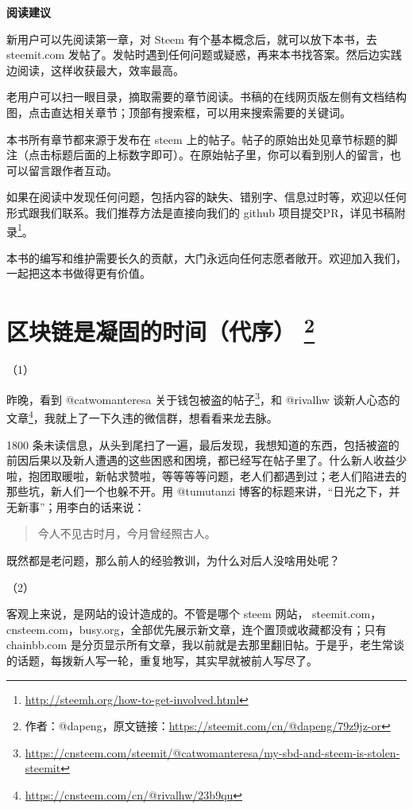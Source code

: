 \documentclass[]{ctexbook}
\renewcommand{\href}[2]{#2\footnote{\url{#1}}}
\begin{document}
\textbf{阅读建议}

新用户可以先阅读第一章，对 Steem 有个基本概念后，就可以放下本书，去 steemit.com 发帖了。发帖时遇到任何问题或疑惑，再来本书找答案。然后边实践边阅读，这样收获最大，效率最高。

老用户可以扫一眼目录，摘取需要的章节阅读。书稿的在线网页版左侧有文档结构图，点击直达相关章节；顶部有搜索框，可以用来搜索需要的关键词。

本书所有章节都来源于发布在 steem 上的帖子。帖子的原始出处见章节标题的脚注（点击标题后面的上标数字即可）。在原始帖子里，你可以看到别人的留言，也可以留言跟作者互动。

如果在阅读中发现任何问题，包括内容的缺失、错别字、信息过时等，欢迎以任何形式跟我们联系。我们推荐方法是直接向我们的 github 项目提交PR，详见\href{http://steemh.org/how-to-get-involved.html}{书稿附录}。

本书的编写和维护需要长久的贡献，大门永远向任何志愿者敞开。欢迎加入我们，一起把这本书做得更有价值。

\hypertarget{secpre}{%
\chapter*{\texorpdfstring{区块链是凝固的时间（代序） \footnote{作者：@dapeng，原文链接：\url{https://steemit.com/cn/@dapeng/79z9jz-or}}}{区块链是凝固的时间（代序） }}\label{secpre}}

（1）

昨晚，看到 \href{https://cnsteem.com/steemit/@catwomanteresa/my-sbd-and-steem-is-stolen-steemit}{@catwomanteresa 关于钱包被盗的帖子}，和 \href{https://cnsteem.com/cn/@rivalhw/23b9qu}{@rivalhw 谈新人心态的文章}，我就上了一下久违的微信群，想看看来龙去脉。

1800 条未读信息，从头到尾扫了一遍，最后发现，我想知道的东西，包括被盗的前因后果以及新人遭遇的这些困惑和困境，都已经写在帖子里了。什么新人收益少啦，抱团取暖啦，新帖求赞啦，等等等等问题，老人们都遇到过；老人们陷进去的那些坑，新人们一个也躲不开。用 @tumutanzi 博客的标题来讲，``日光之下，并无新事''；用李白的话来说：

\begin{quote}
今人不见古时月，今月曾经照古人。
\end{quote}

既然都是老问题，那么前人的经验教训，为什么对后人没啥用处呢？

（2）

客观上来说，是网站的设计造成的。不管是哪个 steem 网站， steemit.com，cnsteem.com，busy.org，全部优先展示新文章，连个置顶或收藏都没有；只有 chainbb.com 是分页显示所有文章，我以前就是去那里翻旧帖。于是乎，老生常谈的话题，每拨新人写一轮，重复地写，其实早就被前人写尽了。
\end{document}
